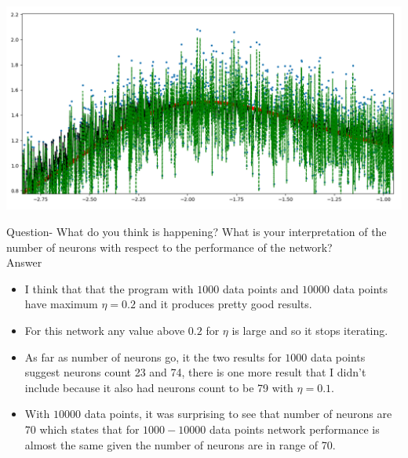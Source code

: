 \documentclass[10pt]{article}         %
\begin{document}
\\\includegraphics[scale=0.45]{hw5q2d2.PNG}

Question- 
What do you think is happening? What is your interpretation of the
number of neurons with respect to the performance of the network?
\\Answer
\begin{itemize}
\item I think that that the program with $1000$ data points and $10000$ data points have maximum  $\eta = 0.2$  and it produces pretty good results.
\item For this network any value above $0.2$ for $ \eta $ is large and so it stops iterating.
\item As far as number of neurons go, it the two results for $1000$ data points suggest neurons count 23 and 74, there is one more result that I didn't include because it also had neurons count to be 79 with $ \eta = 0.1 $. 
\item With $10000$ data points, it was surprising to see that number of neurons are $70$ which states that for $1000-10000$ data points network performance is almost the same given the number of neurons are in range of 70. 
\end{itemize}
\end{document}
